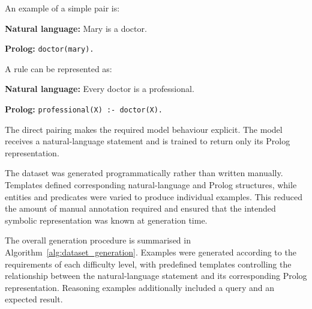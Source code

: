 \documentclass[11pt]{article} %
\theoremstyle{plain}
\theoremstyle{definition}
\begin{document}
An example of a simple pair is:

\begin{tcolorbox}

\textbf{Natural language:} Mary is a doctor.

\medskip

\textbf{Prolog:} \texttt{doctor(mary).}

\end{tcolorbox}

A rule can be represented as:

\begin{tcolorbox}

\textbf{Natural language:} Every doctor is a professional.

\medskip

\textbf{Prolog:} \texttt{professional(X) :- doctor(X).}

\end{tcolorbox}

The direct pairing makes the required model behaviour explicit. The model
receives a natural-language statement and is trained to return only its Prolog
representation.

The dataset was generated programmatically rather than written manually.
Templates defined corresponding natural-language and Prolog structures, while
entities and predicates were varied to produce individual examples. This reduced
the amount of manual annotation required and ensured that the intended symbolic
representation was known at generation time.

The overall generation procedure is summarised in
Algorithm~\ref{alg:dataset_generation}. Examples were generated according
to the requirements of each difficulty level, with predefined templates
controlling the relationship between the natural-language statement and its
corresponding Prolog representation. Reasoning examples additionally
included a query and an expected result.
\end{document}
